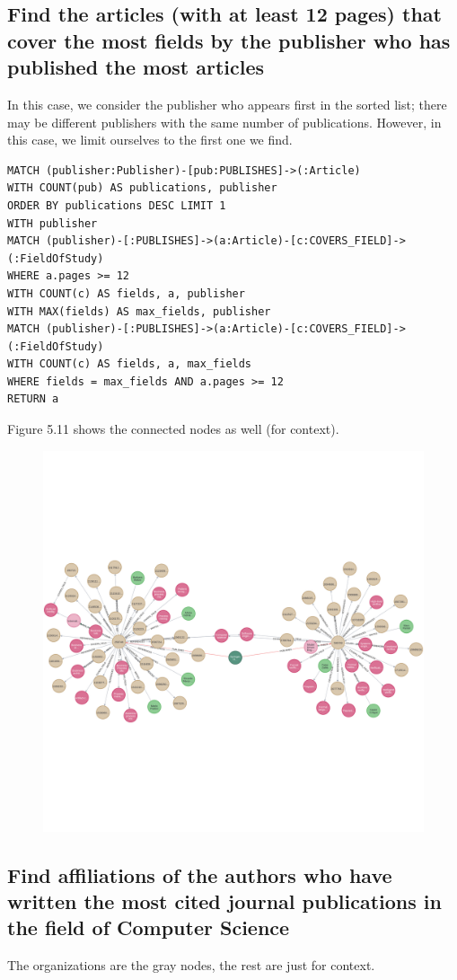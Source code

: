 \documentclass{Configuration_Files/PoliMi3i_thesis}
\begin{document}
\subsection{Find the articles (with at least 12 pages) that cover the most fields by the publisher who has published the most articles}
In this case, we consider the publisher who appears first in the sorted list; there may be different publishers with the same number of publications. However, in this case,  we limit ourselves to the first one we find.\\
\begin{lstlisting}[language=cypher, label=lst:cypher-example]
MATCH (publisher:Publisher)-[pub:PUBLISHES]->(:Article)
WITH COUNT(pub) AS publications, publisher
ORDER BY publications DESC LIMIT 1
WITH publisher
MATCH (publisher)-[:PUBLISHES]->(a:Article)-[c:COVERS_FIELD]->(:FieldOfStudy)
WHERE a.pages >= 12
WITH COUNT(c) AS fields, a, publisher
WITH MAX(fields) AS max_fields, publisher
MATCH (publisher)-[:PUBLISHES]->(a:Article)-[c:COVERS_FIELD]->(:FieldOfStudy)
WITH COUNT(c) AS fields, a, max_fields
WHERE fields = max_fields AND a.pages >= 12
RETURN a
\end{lstlisting}
Figure 5.11 shows the connected nodes as well (for context).
\begin{figure}[H]
    \centering
    \includegraphics[height=0.5\textwidth]{Images/query_9.png}
        \caption{}
    \label{fig:quadtree}
\end{figure}
\subsection{Find affiliations of the authors who have written the most cited journal publications in the field of Computer Science}

The organizations are the gray nodes, the rest are just for context. \\
\end{document}
